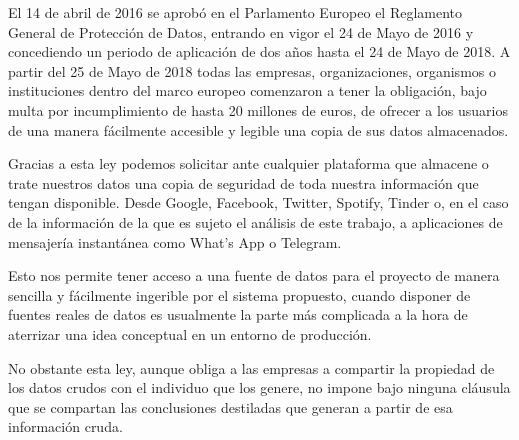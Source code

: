 
El 14 de abril de 2016 se aprobó en el Parlamento Europeo el Reglamento General de Protección de Datos\cite{RGPD}, entrando en vigor el 24 de Mayo de 2016 y concediendo un periodo de aplicación de dos años hasta el 24 de Mayo de 2018. A partir del 25 de Mayo de 2018 todas las empresas, organizaciones, organismos o instituciones dentro del marco europeo comenzaron a tener la obligación, bajo multa por incumplimiento de hasta 20 millones de euros, de ofrecer a los usuarios de una manera fácilmente accesible y legible una copia de sus datos almacenados.

Gracias a esta ley podemos solicitar ante cualquier plataforma que almacene o trate nuestros datos una copia de seguridad de toda nuestra información que tengan disponible. Desde Google\cite{ExportGoogle}, Facebook\cite{ExportFacebook}, Twitter\cite{ExportTwitter}, Spotify\cite{ExportSpotify}, Tinder\cite{ExportTinder} o, en el caso de la información de la que es sujeto el análisis de este trabajo, a aplicaciones de mensajería instantánea como What's App\cite{ExportWhatsApp} o Telegram\cite{ExportTelegram}.

Esto nos permite tener acceso a una fuente de datos para el proyecto de manera sencilla y fácilmente ingerible por el sistema propuesto, cuando disponer de fuentes reales de datos es usualmente la parte más complicada a la hora de aterrizar una idea conceptual en un entorno de producción.

No obstante esta ley, aunque obliga a las empresas a compartir la propiedad de los datos crudos con el individuo que los genere, no impone bajo ninguna cláusula que se compartan las conclusiones destiladas que generan a partir de esa información cruda.

\newpage
